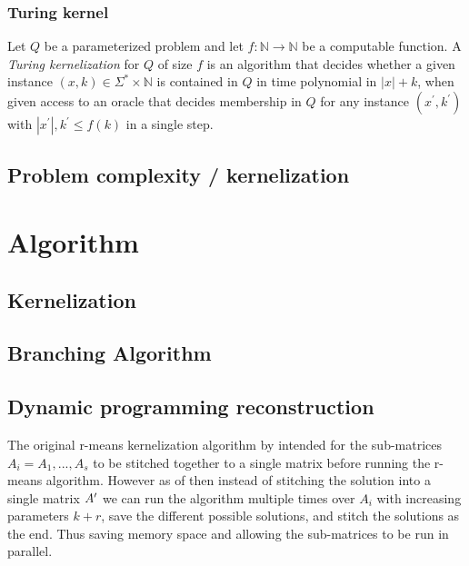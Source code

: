 \documentclass[a4paper]{article}
\begin{document}
\subsubsection{Turing kernel}
\begin{theoremdefinition}
    Let $Q$ be a parameterized problem and let $f:\mathbb{N} \rightarrow \mathbb{N} $
    be a computable function. A \textit{Turing kernelization} for $Q$ of size $f$ is an
    algorithm that decides whether a given instance $(x,k) \in \Sigma^* \times \mathbb{N}$
    is contained in $Q$ in time polynomial in $|x|+k$, when given access to an oracle
    that decides membership in $Q$ for any instance $(x^\prime, k^\prime)$ with
    $|x^\prime|,k^\prime \leq f(k)$ in a single step.
\end{theoremdefinition}\cite[p.~314]{param_algo_book}

\subsection{Problem complexity / kernelization}

%
%
\newpage

\section{Algorithm}
\subsection{Kernelization}


\subsection{Branching Algorithm}


\subsection{Dynamic programming reconstruction}
The original r-means kernelization algorithm by \cite{fomin_golovach_panolan_2020}
intended for the sub-matrices $A_i=A_1,...,A_s$ to be stitched together to a single
matrix before running the r-means algorithm. However as of \cite[Lemma 5]{fomin_golovach_panolan_2020}
then instead of stitching the solution into a single matrix $A\sp{\prime}$
we can run the algorithm multiple times over $A_i$ with increasing parameters $k+r$,
save the different possible solutions, and stitch the solutions as the end. Thus saving
memory space and allowing the sub-matrices to be run in parallel.
\end{document}
